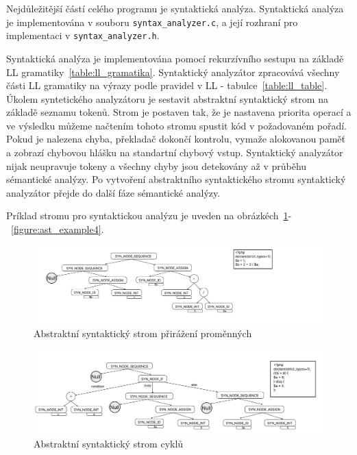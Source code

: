 \documentclass[a4paper, 11pt]{article}
\begin{document}
	Nejdůležitější částí celého programu je syntaktická analýza. Syntaktická analýza je implementována v souboru
	\texttt{syntax\_analyzer.c}, a její rozhraní pro implementaci v \texttt{syntax\_analyzer.h}.

	Syntaktická analýza je implementována pomocí rekurzívního sestupu na základě LL gramatiky~\ref{table:ll_gramatika}. Syntaktický
	analyzátor zpracovává všechny části LL gramatiky na výrazy podle pravidel v LL - tabulce~\ref{table:ll_table}. Úkolem
	syntetického analyzátoru je sestavit abstraktní syntaktický strom na základě seznamu tokenů. Strom je postaven
	tak, že je nastavena priorita operací a ve výsledku můžeme načtením tohoto stromu spustit kód v
	požadovaném pořadí. Pokud je nalezena chyba, překladač dokončí kontrolu, vymaže alokovanou paměť
	a zobrazí chybovou hlášku na standartní chybový vstup. Syntaktický analyzátor nijak neupravuje tokeny a všechny
	chyby jsou detekovány až v průběhu sémantické analýzy. Po vytvoření abstraktního syntaktického stromu
	syntaktický analyzátor přejde do další fáze sémantické analýzy.

	Príklad stromu pro syntaktickou analýzu je uveden na obrázkéch~\ref{figure:ast_example1}-~\ref{figure:ast_example4}.

	\newpage

	\begin{figure}[!ht]
		\centering
		\includegraphics[width=1\linewidth]{assign.pdf}
		\caption{Abstraktní syntaktický strom přirážení proměnných}
		\label{figure:ast_example1}
	\end{figure}

    \begin{figure}[!ht]
		\centering
		\includegraphics[width=1\linewidth]{if.pdf}
		\caption{Abstraktní syntaktický strom cyklů}
		\label{figure:ast_example2}
	\end{figure}
\end{document}
